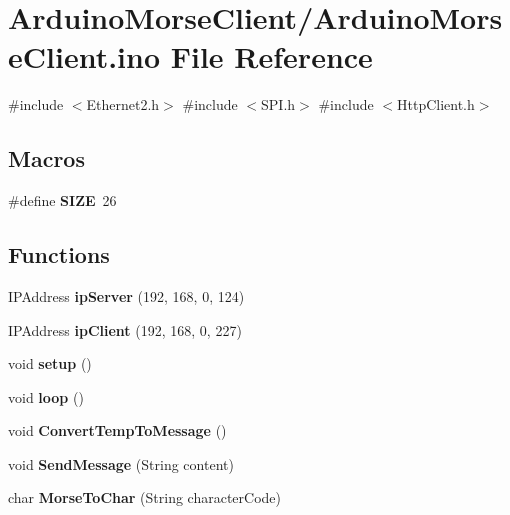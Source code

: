 \hypertarget{_arduino_morse_client_8ino}{}\section{Arduino\+Morse\+Client/\+Arduino\+Morse\+Client.ino File Reference}
\label{_arduino_morse_client_8ino}
{\ttfamily \#include $<$Ethernet2.\+h$>$}\newline
{\ttfamily \#include $<$S\+P\+I.\+h$>$}\newline
{\ttfamily \#include $<$Http\+Client.\+h$>$}\newline
\subsection*{Macros}
\begin{DoxyCompactItemize}
\item 
\mbox{\label{_arduino_morse_client_8ino_a70ed59adcb4159ac551058053e649640}} 
\#define {\bfseries S\+I\+ZE}~26
\end{DoxyCompactItemize}
\subsection*{Functions}
\begin{DoxyCompactItemize}
\item 
\mbox{\label{_arduino_morse_client_8ino_a07256a54d278c1b986c082cfc982d649}} 
I\+P\+Address {\bfseries ip\+Server} (192, 168, 0, 124)
\item 
\mbox{\label{_arduino_morse_client_8ino_aa8cdd0de4ed028d6561c489a51c03e9d}} 
I\+P\+Address {\bfseries ip\+Client} (192, 168, 0, 227)
\item 
\mbox{\label{_arduino_morse_client_8ino_a4fc01d736fe50cf5b977f755b675f11d}} 
void {\bfseries setup} ()
\item 
\mbox{\label{_arduino_morse_client_8ino_afe461d27b9c48d5921c00d521181f12f}} 
void {\bfseries loop} ()
\item 
\mbox{\label{_arduino_morse_client_8ino_a1fe60c5a5dee3af1ed1e0cf380175333}} 
void {\bfseries Convert\+Temp\+To\+Message} ()
\item 
\mbox{\label{_arduino_morse_client_8ino_a4b40eed9d26071a1abd196858475cb7e}} 
void {\bfseries Send\+Message} (String content)
\item 
\mbox{\label{_arduino_morse_client_8ino_a3c352a3078a48318473305aa369f8c5f}} 
char {\bfseries Morse\+To\+Char} (String character\+Code)
\end{DoxyCompactItemize}

